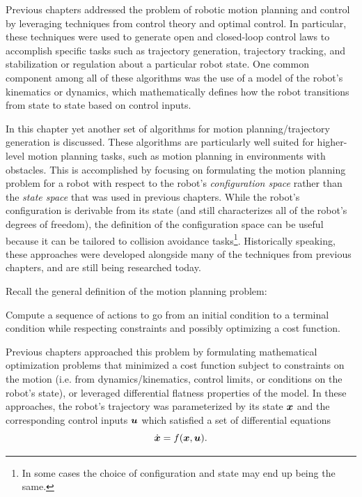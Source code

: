 Previous chapters addressed the problem of robotic motion planning and control by leveraging techniques from control theory and optimal control. In particular, these techniques were used to generate open and closed-loop control laws to accomplish specific tasks such as trajectory generation, trajectory tracking, and stabilization or regulation about a particular robot state. One common component among all of these algorithms was the use of a model of the robot's kinematics or dynamics, which mathematically defines how the robot transitions from state to state based on control inputs.

In this chapter yet another set of algorithms for motion planning/trajectory generation is discussed\cite{LaValle2006}. These algorithms are particularly well suited for higher-level motion planning tasks, such as motion planning in environments with obstacles. This is accomplished by focusing on formulating the motion planning problem for a robot with respect to the robot's \textit{configuration space} rather than the \textit{state space} that was used in previous chapters. While the robot's configuration is derivable from its state (and still characterizes all of the robot's degrees of freedom), the definition of the configuration space can be useful because it can be tailored to collision avoidance tasks\footnote{In some cases the choice of configuration and state may end up being the same.}.
Historically speaking, these approaches were developed alongside many of the techniques from previous chapters, and are still being researched today.

Recall the general definition of the motion planning problem:
\begin{definition}
Compute a sequence of actions to go from an initial condition to a terminal condition while respecting constraints and possibly optimizing a cost function.
\end{definition}
Previous chapters approached this problem by formulating mathematical optimization problems that minimized a cost function subject to constraints on the motion (i.e. from dynamics/kinematics, control limits, or conditions on the robot's state), or leveraged differential flatness properties of the model. In these approaches, the robot's trajectory was parameterized by its state $\bm{x}$ and the corresponding control inputs $\bm{u}$ which satisfied a set of differential equations
\begin{equation*}
    \dot{\bm{x}} = f(\bm{x}, \bm{u}).
\end{equation*}

